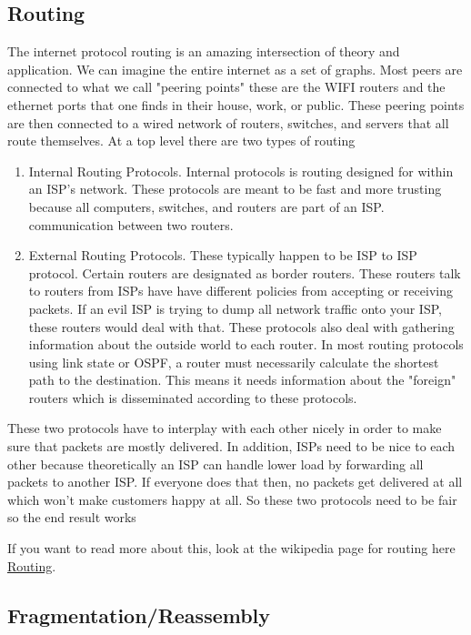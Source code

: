 \subsection{Routing}

The internet protocol routing is an amazing intersection of theory and application.
We can imagine the entire internet as a set of graphs.
Most peers are connected to what we call "peering points" these are the WIFI routers and the ethernet ports that one finds in their house, work, or public.
These peering points are then connected to a wired network of routers, switches, and servers that all route themselves.
At a top level there are two types of routing

\begin{enumerate}
\item Internal Routing Protocols.
  Internal protocols is routing designed for within an ISP's network.
  These protocols are meant to be fast and more trusting because all computers, switches, and routers are part of an ISP.
  communication between two routers.
\item External Routing Protocols.
  These typically happen to be ISP to ISP protocol.
  Certain routers are designated as border routers.
  These routers talk to routers from ISPs have have different policies from accepting or receiving packets.
  If an evil ISP is trying to dump all network traffic onto your ISP, these routers would deal with that.
  These protocols also deal with gathering information about the outside world to each router.
  In most routing protocols using link state or OSPF, a router must necessarily calculate the shortest path to the destination.
  This means it needs information about the "foreign" routers which is disseminated according to these protocols.
\end{enumerate}

These two protocols have to interplay with each other nicely in order to make sure that packets are mostly delivered.
In addition, ISPs need to be nice to each other because theoretically an ISP can handle lower load by forwarding all packets to another ISP.
If everyone does that then, no packets get delivered at all which won't make customers happy at all.
So these two protocols need to be fair so the end result works

If you want to read more about this, look at the wikipedia page for routing here \href{https://en.wikipedia.org/wiki/Routing}{Routing}.

\subsection{Fragmentation/Reassembly}

